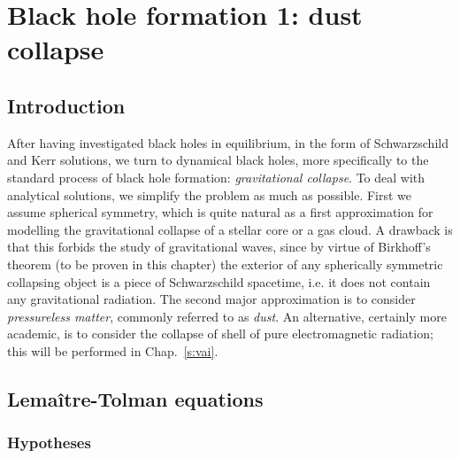 \chapter{Black hole formation 1: dust collapse}
\label{s:lem}

\minitoc

\section{Introduction}

After having investigated black holes in equilibrium, in the form of
Schwarzschild and Kerr solutions, we turn to dynamical black holes,
more specifically to the standard process of
black hole formation: \emph{gravitational collapse}.
To deal with analytical solutions, we simplify the problem as much as
possible. First we assume spherical symmetry, which is quite natural
as a first approximation for modelling the gravitational collapse
of a stellar core or a gas cloud. A drawback is that this forbids the
study of gravitational waves, since by
virtue of Birkhoff's theorem (to be proven in this chapter)
the exterior
of any spherically symmetric collapsing object is a piece of Schwarzschild
spacetime, i.e. it does not contain any gravitational radiation.
The second major approximation is to consider \emph{pressureless matter},
commonly referred to as \emph{dust}.
An alternative, certainly more academic, is to consider the collapse of shell of pure electromagnetic radiation; this will be performed in Chap.~\ref{s:vai}.

\section{Lemaître-Tolman equations}

\subsection{Hypotheses} \label{s:lem:hyp}

